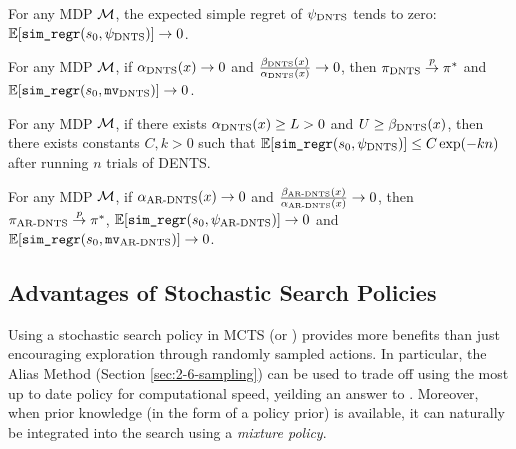        \begin{theorem} \label{thrm:4:dents}
            For any MDP $\mathcal{M}$, the expected simple regret of ${\psi_{{\textnormal{DNTS}}}}$ tends to zero: $\mathbb{E}[{\textnormal{\texttt{sim\_regr}}}(s_0,{\psi_{{\textnormal{DNTS}}}})]\rightarrow 0$.
        \end{theorem}

        \begin{theorem} \label{thrm:4:dents_decay}
            For any MDP $\mathcal{M}$, if ${\alpha_{{\textnormal{DNTS}}}}(x)\rightarrow 0$ and $\frac{{\beta_{{\textnormal{DNTS}}}}(x)}{{\alpha_{{\textnormal{DNTS}}}}(x)}\rightarrow 0$, then ${\pi_{{\textnormal{DNTS}}}}\overset{p}{\to} \pi^*$ and $\mathbb{E}[{\textnormal{\texttt{sim\_regr}}}(s_0,{\textup{\texttt{mv}}_{{\textnormal{DNTS}}}})]\rightarrow 0$. 
        \end{theorem}

        \begin{theorem} \label{thrm:4:dents_exp}
            For any MDP $\mathcal{M}$, if there exists ${\alpha_{{\textnormal{DNTS}}}}(x)\geq L > 0$ and $U\geq{\beta_{{\textnormal{DNTS}}}}(x)$, then there exists constants $C,k>0$ such that $\mathbb{E}[{\textnormal{\texttt{sim\_regr}}}(s_0,{\psi_{{\textnormal{DNTS}}}})] \leq C\exp(-kn)$ after running $n$ trials of DENTS.
        \end{theorem}
        
        \begin{theorem} \label{thrm:4:ar_dents}
            For any MDP $\mathcal{M}$, if ${\alpha_{{\textnormal{AR-DNTS}}}}(x)\rightarrow 0$ and $\frac{{\beta_{{\textnormal{AR-DNTS}}}}(x)}{{\alpha_{{\textnormal{AR-DNTS}}}}(x)}\rightarrow 0$, then ${\pi_{{\textnormal{AR-DNTS}}}}\overset{p}{\to} \pi^*$, $\mathbb{E}[{\textnormal{\texttt{sim\_regr}}}(s_0,{\psi_{{\textnormal{AR-DNTS}}}})]\rightarrow 0$ and  $\mathbb{E}[{\textnormal{\texttt{sim\_regr}}}(s_0,{\textup{\texttt{mv}}_{{\textnormal{AR-DNTS}}}})]\rightarrow 0$. 
        \end{theorem} 












    \subsection{Advantages of Stochastic Search Policies}
    \label{sec:4-2-3-stoch_search_policies}

        Using a stochastic search policy in MCTS (or \thtspp) provides more benefits than just encouraging exploration through randomly sampled actions. In particular, the Alias Method (Section \ref{sec:2-6-sampling}) can be used to trade off using the most up to date policy for computational speed, yeilding an answer to \complexityq. Moreover, when prior knowledge (in the form of a policy prior) is available, it can naturally be integrated into the search using a \textit{mixture policy}.






